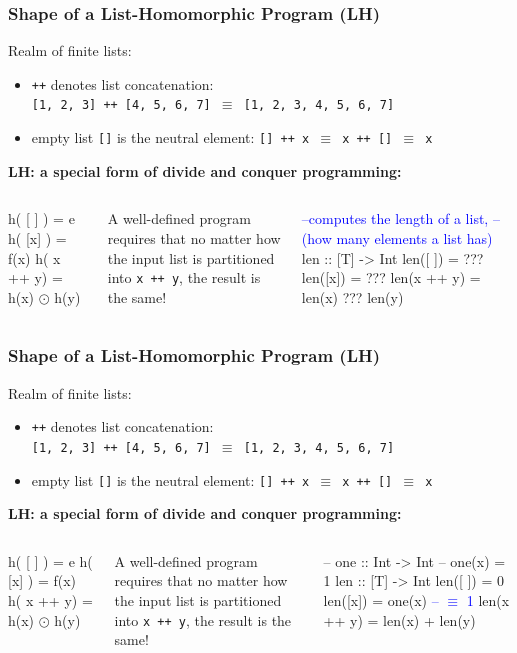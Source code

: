 \documentclass{beamer}
\newcommand{\blue}[1]{\textcolor{Blue}{{#1}}}
\newcommand{\emp}[1]{\textcolor{DikuRed}{ #1}}
\newcommand{\mymath}[1]{$ #1 $}
\begin{document}
\begin{frame}[fragile,t]
\frametitle{Shape of a List-Homomorphic Program (LH)}

Realm of finite lists:
\begin{itemize}
    \item {\tt ++} denotes list concatenation:\\
    {\tt [1, 2, 3] ++ [4, 5, 6, 7] $\equiv$ [1, 2, 3, 4, 5, 6, 7]}
    \item empty list {\tt []} is the neutral element:
        {\tt [] ++ x $\equiv$ x ++ [] $\equiv$ x}
\end{itemize}
\bigskip

\emp{\bf LH: a special form of divide and conquer programming:}
\begin{columns}
\begin{colorcode}[fontsize=\small]
h( [ ] )   = e
h( [x] )   = f(x)
h( x ++ y) = h(x) \mymath{\odot} h(y)
\end{colorcode}
\pause
\alert{A well-defined program requires that no matter how 
the input list is partitioned into {\tt x ++ y}, the result is the same!}
\begin{colorcode}[fontsize=\small]
\blue{--computes the length of a list,}
\blue{--(how many elements a list has)}
len :: [T] -> Int
len([ ])    = \alert{???}
len([x])    = \alert{???}
len(x ++ y) = len(x) \alert{???} len(y)
\end{colorcode}
\end{columns}

\end{frame}

\begin{frame}[fragile,t]
\frametitle{Shape of a List-Homomorphic Program (LH)}

Realm of finite lists:
\begin{itemize}
    \item {\tt ++} denotes list concatenation:\\
    {\tt [1, 2, 3] ++ [4, 5, 6, 7] $\equiv$ [1, 2, 3, 4, 5, 6, 7]}
    \item empty list {\tt []} is the neutral element:
        {\tt [] ++ x $\equiv$ x ++ [] $\equiv$ x}
\end{itemize}
\bigskip

\emp{\bf LH: a special form of divide and conquer programming:}
\begin{columns}
\begin{colorcode}[fontsize=\small]
h( [ ] )   = e
h( [x] )   = f(x)
h( x ++ y) = h(x) \mymath{\odot} h(y)
\end{colorcode}
\alert{A well-defined program requires that no matter how 
the input list is partitioned into {\tt x ++ y}, the result is the same!}
\begin{colorcode}[fontsize=\small]
-- one :: Int -> Int
-- one(x) = 1
len :: [T] -> Int
len([ ])    = \emp{0}
len([x])    = \emp{one}(x) \blue{-- \mymath{\equiv} 1}
len(x ++ y) = len(x) \emp{+} len(y)
\end{colorcode}
\end{columns}

\end{frame}
\end{document}
